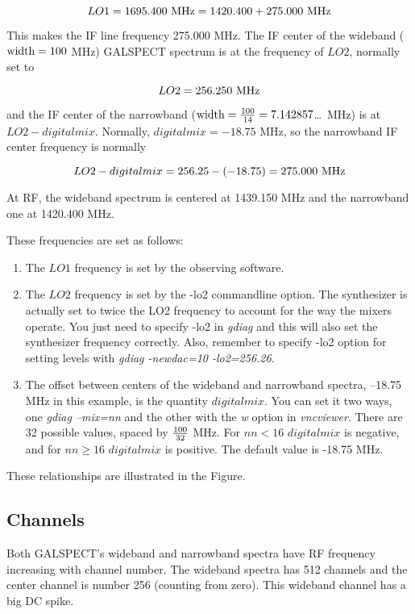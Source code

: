 \documentclass[psfig,preprint]{aastex}
\begin{document}
$$ LO1 = 1695.400 \ {\rm MHz} =1420.400+275.000 \ {\rm MHz} $$

\noindent This makes the IF line frequency 275.000 MHz. The IF center of
the wideband (${\rm width}=100$ MHz) GALSPECT spectrum is at the
frequency of $LO2$, normally set to 

$$ LO2 = 256.250 \ {\rm MHz} $$

\noindent and the IF center of the narrowband (${\rm width}={100 \over 14} =
7.142857$\dots \  MHz) is at $ LO2 - digitalmix$. Normally, $digitalmix =
-18.75$ MHz, so the narrowband IF center frequency is normally

$$ LO2 - digitalmix = 256.25 - (- 18.75) = 275.000 \ {\rm MHz} $$

\noindent At RF, the wideband spectrum is centered at 1439.150 MHz and
the narrowband one at 1420.400 MHz. 

	These frequencies are set as follows: \begin{enumerate}

	\item The $LO1$ frequency is set by the observing software.

	\item The $LO2$ frequency is set by the -lo2 commandline option. The
synthesizer is actually set to twice the LO2 frequency to account for 
the way the mixers operate. You just need to specify -lo2 in {\it
gdiag} and this will also set the synthesizer frequency
correctly. Also, remember to specify -lo2 option for setting levels
with {\it gdiag -newdac=10 -lo2=256.26}.

	\item The offset between centers of the wideband and narrowband
spectra, --18.75 MHz in this example, is the quantity $digitalmix$. You
can set it two ways, one {\it gdiag --mix=nn} and the other with the {\it
w} option in {\it vncviewer}. There are 32 possible values, spaced by
$100 \over 32$ MHz. For $nn < 16$ $digitalmix$ is negative, and for $nn
\ge 16$  $digitalmix$ is positive. The default value is -18.75 MHz.

\end{enumerate}

	These relationships are illustrated in the Figure.


\subsection{Channels}

	Both GALSPECT's wideband and narrowband spectra have RF
frequency increasing with channel number.  The wideband spectra has 512
channels and the center channel is number 256 (counting from zero). 
This wideband channel has a big DC spike. 
\end{document}
